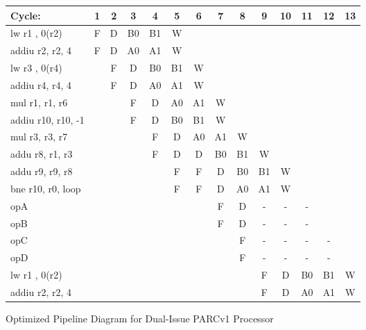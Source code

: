\documentclass[10pt]{article}
\begin{document}
\begin{figure}[H]
\centering
{\setlength{\tabcolsep}{2pt}
\begin{tabular}{|l|c|c|c|c!{\vrule width 1.5pt}c|c|c|c|c|c|c|c!{\vrule width 1.5pt}c|}
\hline
Cycle:            & 1  & 2  & 3  & 4  & 5  & 6  & 7  & 8  & 9  & 10 & 11 & 12 & 13 \\ \hline
lw r1 , 0(r2)     & F  & D  & B0 & B1 & W  &    &    &    &    &    &    &    &    \\ \hline
addiu r2, r2, 4   & F  & D  & A0 & A1 & W  &    &    &    &    &    &    &    &    \\ \hline
lw r3 , 0(r4)     &    & F  & D  & B0 & B1 & W  &    &    &    &    &    &    &    \\ \hline
addiu r4, r4, 4   &    & F  & D  & A0 & A1 & W  &    &    &    &    &    &    &    \\ \hline
mul r1, r1, r6    &    &    & F  & D  & A0 & A1 & W  &    &    &    &    &    &    \\ \hline
addiu r10, r10, -1&    &    & F  & D  & B0 & B1 & W  &    &    &    &    &    &    \\ \hline
mul r3, r3, r7    &    &    &    & F  & D  & A0 & A1 & W  &    &    &    &    &    \\ \hline
addu r8, r1, r3   &    &    &    & F  & D  & D  & B0 & B1 & W  &    &    &    &    \\ \hline
addu r9, r9, r8   &    &    &    &    & F  & F  & D  & B0 & B1 & W  &    &    &    \\ \hline
bne r10, r0, loop &    &    &    &    & F  & F  & D  & A0 & A1 & W  &    &    &    \\ \hline
opA               &    &    &    &    &    &    & F  & D  & -  & -  & -  &    &    \\ \hline
opB               &    &    &    &    &    &    & F  & D  & -  & -  & -  &    &    \\ \hline
opC               &    &    &    &    &    &    &    & F  & -  & -  & -  & -  &    \\ \hline
opD               &    &    &    &    &    &    &    & F  & -  & -  & -  & -  &    \\ \hline
lw r1 , 0(r2)     &    &    &    &    &    &    &    &    & F  & D  & B0 & B1 & W  \\ \hline
addiu r2, r2, 4   &    &    &    &    &    &    &    &    & F  & D  & A0 & A1 & W  \\ \hline
\end{tabular}
}
\caption{Optimized Pipeline Diagram for Dual-Issue PARCv1 Processor}
\end{figure}
\end{document}
